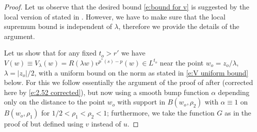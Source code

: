 \documentclass[10pt]{amsart}
\begin{document}
\begin{proof}
Let us observe that  the desired bound \eqref{e:bound for v} is suggested by the local version of \cite[Theorem 2.1]{V11} stated in \cite[Remark 2.3]{V11}. However,  we have to make sure that the local supremum bound is independent of $\lambda$, therefore we provide the details of the argument.

  Let us show  that  for any fixed $t_o>r'$  we have $V(w)\equiv V_\lambda(w)=R(\lambda w)v^{p^*(s)-p}(w)\in L^{t_o}$ near  the point $w_o=z_o/\lambda$, $\lambda=|z_o|/2$, with a uniform bound on the norm as stated in \eqref{e:V uniform bound} below. For this we follow essentially the argument of the proof  of \cite[Theorem 2.9]{V11} after \cite[(2.53)]{V11} (corrected here by \eqref{e:2.52 corrected}), but now using a smooth bump function $\alpha$  depending only on the distance to the point $w_o$ with support in $B(w_o,\rho_2)$ with $\alpha\equiv 1$ on $B{(w_o,\rho_1)}$ for $1/2<\rho_1<\rho_2<1$; furthermore, we take the  function $G$ as in the proof of \cite[Thorem 2.9]{V11} but defined using $v$ instead of $u$. %


\end{proof}
\end{document}
